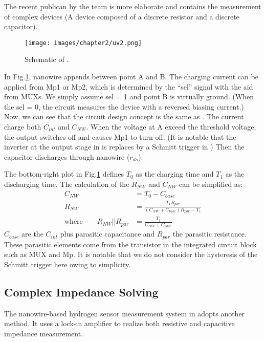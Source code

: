 The recent publican \cite{Juv2} by the team is more elaborate and contains the measurement of complex devices (A device composed of a discrete resistor and a discrete capacitor).
\begin{figure}[!htbp]
    \centering
    \texttt{[image: images/chapter2/uv2.png]}
    \caption{Schematic of \cite{Juv2}.}
    \label{fig:tot2}
\end{figure}

In Fig.\ref{fig:tot2}, nanowire appends between point A and B.
The charging current can be applied from Mp1 or Mp2, which is determined by the ``sel'' signal with the aid from MUXs.
We simply assume sel = 1 and point B is virtually ground.
(When the sel = 0, the circuit measures the device with a reversed biasing current.)
Now, we can see that the circuit design concept is the same as \cite{Juv1}.
The current charge both $C_{int}$ and $C_{NW}$.
When the voltage at A exceed the threshold voltage, the output switches off and causes Mp1 to turn off.
(It is notable that the inverter at the output stage in \cite{Juv1} is replaces by a Schmitt trigger in \cite{Juv2})
Then the capacitor discharges through nanowire ($r_{ds}$).

The bottom-right plot in Fig.\ref{fig:tot2} defines $T_0$ as the charging time and $T_1$ as the discharging time.
The calculation of the $R_{NW}$ and $C_{NW}$  can be simplified as:
\setlength{\mathindent}{2cm}
\begin{align}
                         C_{NW}            & = T_0 - C_{base}\\
                         R_{NW}            & = \frac{T_1R_{par}}{(C_{NW} + C_{base})R_{par} - T_1}\\
    \text{where} \qquad  R_{NW} || R_{par} & = \frac{T_1}{C_{NW} + C_{base}}
\end{align}
$C_{base}$ are the $C_{int}$ plus parasitic capacitance and $R_{par}$ the parasitic resistance.
These parasitic elements come from the transistor in the integrated circuit block such as MUX and Mp.
It is notable that we do not consider the hysteresis of the Schmitt trigger here owing to simplicity.


\subsection{Complex Impedance Solving}
The nanowire-based hydrogen sensor measurement system in \cite{Jlockin} adopts another method.
It uses a lock-in amplifier to realize both resistive and capacitive impedance measurement.

